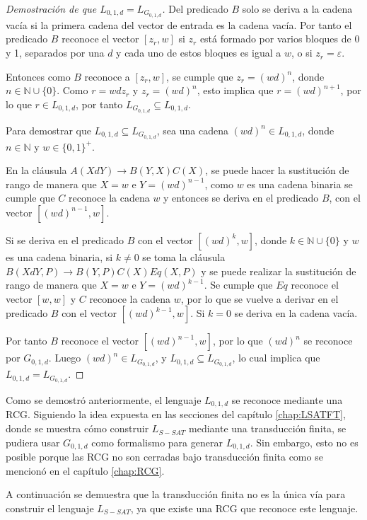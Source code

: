 \begin{proof}[Demostración de que $L_{0,1,d}=L_{G_{0,1,d}}$]
    Del predicado $B$ solo se deriva a la cadena vacía si la primera cadena del vector de entrada es la cadena vacía. Por tanto el predicado $B$ reconoce el vector $[z_r,w]$ si $z_r$ está formado por varios bloques de 0 y 1, separados por una $d$ y cada uno de estos bloques es igual a $w$, o si $z_r=\varepsilon$.
    
    Entonces como $B$ reconoce a $[z_r,w]$, se cumple que $z_r=(wd)^n$, donde $n\in \mathbb{N}\cup \{0\}$. Como $r=wdz_r$ y $z_r=(wd)^n$, esto implica que $r=(wd)^{n+1}$, por lo que $r\in L_{0,1,d}$, por tanto $L_{G_{0,1,d}}\subseteq L_{0,1,d}$.
    
    Para demostrar que $L_{0,1,d}\subseteq L_{G_{0,1,d}}$, sea una cadena $(wd)^n\in L_{0,1,d}$, donde $n\in \mathbb{N}$ y $w \in \{0,1\}^+$.
    
    En la cláusula $A(XdY)\to B(Y,X)C(X)$, se puede hacer la sustitución de rango de manera que $X=w$ e $Y=(wd)^{n-1}$, como $w$ es una cadena binaria se cumple que $C$ reconoce la cadena $w$ y entonces se deriva en el predicado $B$, con el vector $[(wd)^{n-1},w]$.
    
    Si se deriva en el predicado $B$ con el vector $[(wd)^k,w]$, donde 
    $k\in \mathbb{N} \cup \{0\}$ y $w$ es una cadena binaria, si $k\neq 0$ se toma la cláusula
    $B(XdY,P)\to B(Y,P) C(X) Eq(X,P)$ y se puede realizar la sustitución de rango de manera que
    $X=w$ e $Y=(wd)^{k-1}$. Se cumple que $Eq$ reconoce el vector $[w,w]$ y $C$ reconoce la cadena $w$,
    por lo que se vuelve a derivar en el  predicado $B$ con el vector $[(wd)^{k-1},w]$. Si $k=0$ se deriva
    en la cadena vacía.
    
    Por tanto $B$ reconoce el vector $[(wd)^{n-1},w]$, por lo que $(wd)^n$ se reconoce por $G_{0,1,d}$. Luego
    $(wd)^n\in L_{G_{0,1,d}}$, y $L_{0,1,d}\subseteq L_{G_{0,1,d}}$, lo cual implica
    que $L_{0,1,d} = L_{G_{0,1,d}}$.
\end{proof}

Como se demostró anteriormente, el lenguaje $L_{0,1,d}$ se reconoce mediante una RCG.  Siguiendo la idea expuesta en las secciones del capítulo \ref{chap:LSATFT}, donde se muestra cómo construir $L_{S-SAT}$ mediante una transducción finita, se pudiera usar $G_{0,1,d}$ como formalismo para generar $L_{0,1,d}$. Sin embargo, esto no es posible porque las RCG no son cerradas bajo transducción finita como se mencionó en el capítulo \ref{chap:RCG}.


A continuación se demuestra que la transducción finita no es la única vía para construir el lenguaje $L_{S-SAT}$, ya que existe una RCG que reconoce este lenguaje.

